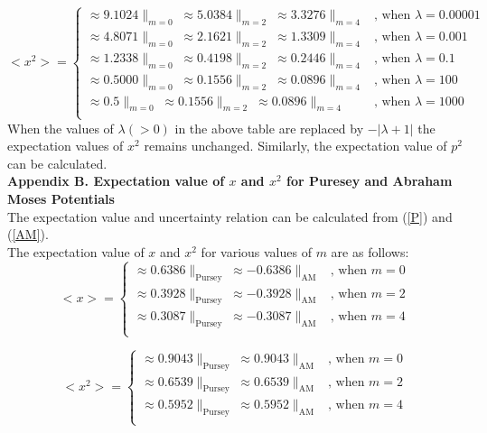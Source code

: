 \documentclass[11pt]{article}
\begin{document}
\begin{equation*}
<x^2> =
\begin{cases}
\approx 9.1024\|_{m=0}\;\approx 5.0384\|_{m=2}\;\approx 3.3276\|_{m=4}&\text{, when $\lambda=0.00001$}\\
\approx 4.8071\|_{m=0}\;\approx 2.1621\|_{m=2}\;\approx 1.3309\|_{m=4}&\text{, when $\lambda=0.001$}\\
\approx 1.2338\|_{m=0}\;\approx 0.4198\|_{m=2}\;\approx 0.2446\|_{m=4}&\text{, when $\lambda=0.1$}\\
\approx 0.5000\|_{m=0}\;\approx 0.1556\|_{m=2}\;\approx 0.0896\|_{m=4}&\text{, when $\lambda=100$}\\
\approx 0.5\|_{m=0}\;\approx 0.1556\|_{m=2}\;\approx 0.0896\|_{m=4}&\text{, when $\lambda=1000$}\\\end{cases}
\end{equation*}
When the values of \( \lambda (>0) \) in the above table are replaced by \( -|\lambda+1| \) the expectation values of \( x^2 \) remains unchanged.
Similarly, the expectation value of  \( p^2 \) can be calculated.\\

{\bf Appendix B. Expectation value of \( x \) and \( x^2 \) for Puresey and 
Abraham Moses Potentials} \\
The expectation value and uncertainty relation can be calculated from (\ref{P}) and (\ref{AM}).\\

The expectation value of \( x \) and \( x^2 \) for various values of \( m \) are as follows:
\begin{equation*}
<x> =
\begin{cases}
\approx 0.6386\|_{\text{Pursey}}\;\approx -0.6386\|_{\text{AM}}&\text{, when $m=0$}\\
\approx 0.3928\|_{\text{Pursey}}\;\approx -0.3928\|_{\text{AM}}&\text{, when $m=2$}\\
\approx 0.3087\|_{\text{Pursey}}\;\approx -0.3087\|_{\text{AM}}&\text{, when $m=4$}\\
\end{cases}
\end{equation*}

\begin{equation*}
<x^2> =
\begin{cases}
\approx 0.9043\|_{\text{Pursey}}\;\approx 0.9043\|_{\text{AM}}&\text{, when $m=0$}\\
\approx 0.6539\|_{\text{Pursey}}\;\approx 0.6539\|_{\text{AM}}&\text{, when $m=2$}\\
\approx 0.5952\|_{\text{Pursey}}\;\approx 0.5952\|_{\text{AM}}&\text{, when $m=4$}\\
\end{cases}
\end{equation*}
\end{document}
